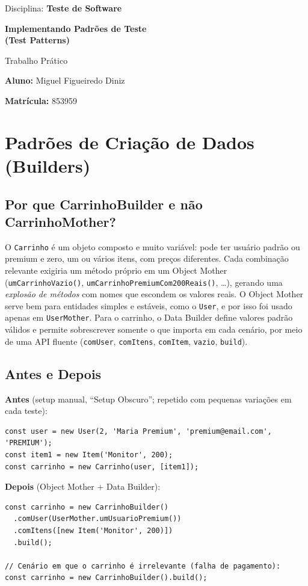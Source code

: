 \documentclass[11pt,a4paper]{article}
\begin{document}
\begin{titlepage}
\centering\vspace*{5cm}
{\large Disciplina: \textbf{Teste de Software}\par}\vspace{1.5cm}
{\Huge\bfseries Implementando Padrões de Teste\\(Test Patterns)\par}\vspace{1cm}
{\large Trabalho Prático\par}\vspace{3cm}
{\large \textbf{Aluno:} Miguel Figueiredo Diniz\par}\vspace{.3cm}
{\large \textbf{Matrícula:} 853959\par}
\end{titlepage}

\section{Padrões de Criação de Dados (Builders)}
\subsection{Por que CarrinhoBuilder e não CarrinhoMother?}
O \texttt{Carrinho} é um objeto composto e muito variável: pode ter usuário padrão ou premium e zero, um ou vários itens, com preços diferentes. Cada combinação relevante exigiria um método próprio em um Object Mother (\texttt{umCarrinhoVazio()}, \texttt{umCarrinhoPremiumCom200Reais()}, \ldots), gerando uma \emph{explosão de métodos} com nomes que escondem os valores reais. O Object Mother serve bem para entidades simples e estáveis, como o \texttt{User}, e por isso foi usado apenas em \texttt{UserMother}. Para o carrinho, o Data Builder define valores padrão válidos e permite sobrescrever somente o que importa em cada cenário, por meio de uma API fluente (\texttt{comUser}, \texttt{comItens}, \texttt{comItem}, \texttt{vazio}, \texttt{build}).

\subsection{Antes e Depois}
\textbf{Antes} (setup manual, ``Setup Obscuro''; repetido com pequenas variações em cada teste):
\begin{lstlisting}
const user = new User(2, 'Maria Premium', 'premium@email.com', 'PREMIUM');
const item1 = new Item('Monitor', 200);
const carrinho = new Carrinho(user, [item1]);
\end{lstlisting}
\textbf{Depois} (Object Mother + Data Builder):
\begin{lstlisting}
const carrinho = new CarrinhoBuilder()
  .comUser(UserMother.umUsuarioPremium())
  .comItens([new Item('Monitor', 200)])
  .build();

// Cenário em que o carrinho é irrelevante (falha de pagamento):
const carrinho = new CarrinhoBuilder().build();
\end{lstlisting}
\end{document}
